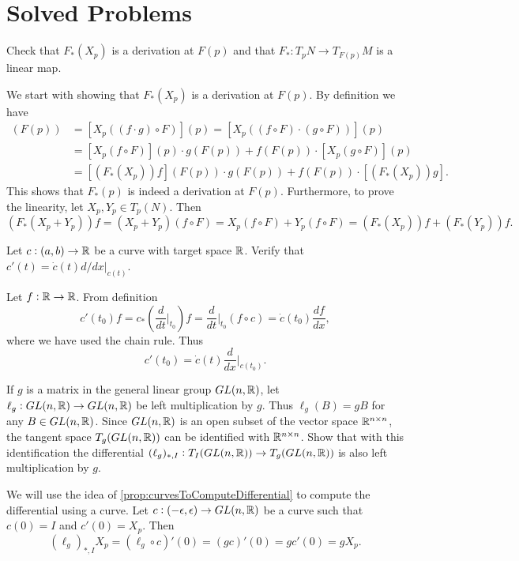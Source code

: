 
\section{Solved Problems}
\begin{problem}
	\label{prob:DifferentialOfAMapIsADerivation}
	Check that $ F_*(X_p) $ is a derivation at $ F(p) $ and that $ F_*: T_p N \to T_{F(p)}M  $ is a linear map.
\end{problem}
\begin{solution}
	We start with showing that $ F_*(X_p) $ is a derivation at $ F(p) $. By definition we have
	\begin{align*}
		[(F_*(X_p))(f\cdot g)](F(p)) &=  [ X_p((f\cdot g)\circ F) ](p) = [ X_p((f\circ F) \cdot (g\circ F)) ](p)\\
		&= [X_p(f\circ F)](p) \cdot g(F(p)) + f(F(p))\cdot [X_p(g\circ F)](p)\\
		&= [(F_*(X_p))f](F(p)) \cdot g(F(p)) + f(F(p))\cdot [(F_*(X_p))g].
	\end{align*}
	This shows that $ F_*(p) $ is indeed a derivation at $ F(p) $. Furthermore, to prove the linearity, let $ X_p, Y_p \in T_p(N) $. Then
	\[ (F_*(X_p + Y_p))f = (X_p + Y_p)(f\circ F) = X_p(f\circ F) + Y_p(f\circ F) = (F_*(X_p)) f + (F_*(Y_p)) f. \]
\end{solution}


\begin{problem}
	\label{prob:VelocutyVecotrAndCalculusNotation}
	Let $ c:(a,b) \to \mathbb{R} $ be a curve with target space $ \mathbb{R} $. Verify that $ c'(t) = \dot{c}(t) d/dx|_{c(t)} $.
\end{problem}
\begin{solution}
	Let $ f: \mathbb{R} \to \mathbb{R} $. From definition 
	\[ c'(t_0) f = c_*(\frac{d}{dt}\big|_{t_0})f = \frac{d}{dt}\big|_{t_0}(f\circ c) = \dot{c}(t_0) \frac{df}{dx}, \]
	where we have used the chain rule. Thus
	\[ c'(t_0) = \dot{c}(t) \frac{d}{dx}\big|_{c(t_0)}. \]
\end{solution}

\begin{problem}
	If $ g $ is a matrix in the general linear group $ GL(n,\mathbb{R}) $, let $ \ell_g: GL(n,\mathbb{R}) \to GL(n,\mathbb{R}) $ be left 
	multiplication by $ g $. Thus $ \ell_g(B) = gB $ for any $ B \in GL(n,\mathbb{R}) $. Since $ GL(n,\mathbb{R}) $ is an open subset of the vector space $ \mathbb{R}^{n\times n} $, the tangent space $ T_g(GL(n,\mathbb{R})) $ can be identified with $ \mathbb{R}^{n\times n} $. Show that with this identification the differential $ (\ell_g)_{*,I}: T_I(GL(n,\mathbb{R})) \to T_g(GL(n,\mathbb{R})) $ is also left multiplication by $ g $. 
\end{problem}
\begin{solution}
	We will use the idea of \autoref{prop:curvesToComputeDifferential} to compute the differential using a curve. Let $ c: (-\epsilon,\epsilon) \to GL(n,\mathbb{R}) $ be a curve such that $ c(0) = I $ and $ c'(0) = X_p $. Then 
	\[ (\ell_g)_{*,I} X_p = (\ell_g\circ c)'(0) = (gc)'(0) = g c'(0) = gX_p. \]
\end{solution}

